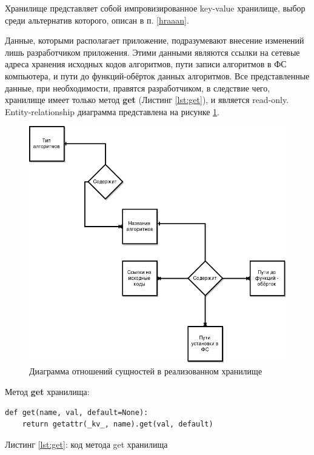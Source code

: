 Хранилище представляет собой импровизированное key-value хранилище, выбор среди
альтернатив которого, описан в п. \ref{hraaan}.

Данные, которыми располагает приложение, подразумевают внесение изменений лишь
разработчиком приложения. Этими данными являются ссылки на сетевые адреса
хранения исходных кодов алгоритмов, пути записи алгоритмов в ФС компьютера, и
пути до функций-обёрток данных алгоритмов. Все представленные данные, при
необходимости, правятся разработчиком, в следствие чего, хранилище имеет только
метод \textbf{get} (Листинг \ref{lst:get}), и является read-only. Entity-relationship диаграмма
представлена на рисунке \ref{er}.

\begin{figure}[h]
    \centering
    \includegraphics[width=\textwidth]{images/er}
    \caption{Диаграмма отношений сущностей в реализованном хранилище}\label{er}
\end{figure}

\newpage
Метод \textbf{get} хранилища:

\begin{center}
\begin{lstlisting}
def get(name, val, default=None):
    return getattr(_kv_, name).get(val, default)
\end{lstlisting}\label{lst:get}
Листинг \ref{lst:get}: код метода get хранилища
\end{center}

